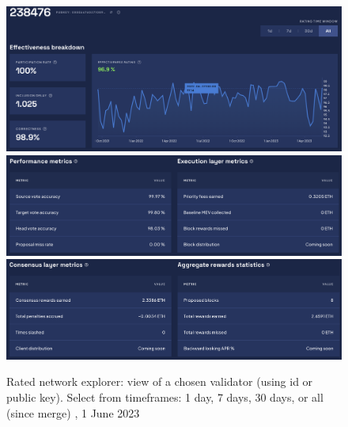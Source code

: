 \documentclass[UTF8]{article}
\begin{document}
\begin{figure}[htbp]
\begin{center}
\includegraphics[width=\linewidth]{images/ratedentity4a}\\
\includegraphics[width=\linewidth]{images/ratedentity4b}\\
\includegraphics[width=\linewidth]{images/ratedentity4c}
\caption{Rated network explorer: view of a chosen validator (using id or public key). Select from timeframes: 1 day, 7 days, 30 days, or all (since merge) , 1 June 2023}
\label{fig:ratedentity4}
\end{center}
\end{figure}
\clearpage
\end{document}
